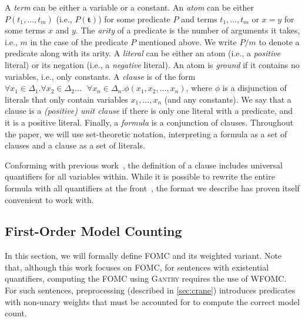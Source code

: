 \documentclass[a4paper,UKenglish,cleveref, autoref, thm-restate]{lipics-v2021}
\newcommand{\Cranetwo}{\textsc{Gantry}}
\begin{document}
A \emph{term} can be either a variable or a constant. An \emph{atom} can be
either $P(t_{1}, \dots, t_{m})$ (i.e., $P(\mathbf{t})$) for some predicate $P$
and terms $t_{1}, \dots, t_{m}$ or $x=y$ for some terms $x$ and $y$. The
\emph{arity} of a predicate is the number of arguments it takes, i.e., $m$ in
the case of the predicate $P$ mentioned above. We write $P/m$ to denote a
predicate along with its arity. A \emph{literal} can be either an atom (i.e., a
\emph{positive} literal) or its negation (i.e., a \emph{negative} literal). An
atom is \emph{ground} if it contains no variables, i.e., only constants. A
\emph{clause} is of the form $\forall x_{1} \in \Delta_{1}\text{.
}\forall x_{2} \in \Delta_{2}\dots\text{ }\forall x_{n} \in \Delta_{n}\text{.
}\phi(x_{1}, x_{2}, \dots, x_{n})$, where $\phi$ is a disjunction of literals
that only contain variables $x_{1}, \dots, x_{n}$ (and any constants). We say
that a clause is a \emph{(positive) unit clause} if there is only one literal
with a predicate, and it is a positive literal. Finally, a \emph{formula} is a
conjunction of clauses. Throughout the paper, we will use set-theoretic
notation, interpreting a formula as a set of clauses and a clause as a set of
literals.

\begin{remark*}
  Conforming with previous work~\cite{DBLP:conf/ijcai/BroeckTMDR11}, the
  definition of a clause includes universal quantifiers for all variables
  within. While it is possible to rewrite the entire formula with all
  quantifiers at the front~\cite{hinman2018fundamentals}, the format we describe
  has proven itself convenient to work with.
\end{remark*}

\subsection{First-Order Model Counting}

In this section, we will formally define FOMC and its weighted variant. Note
that, although this work focuses on FOMC, for sentences with existential
quantifiers, computing the FOMC using \Cranetwo{} requires the use of WFOMC\@.
For such sentences, preprocessing (described in \cref{sec:crane}) introduces
predicates with non-unary weights that must be accounted for to compute the
correct model count.

\end{document}
